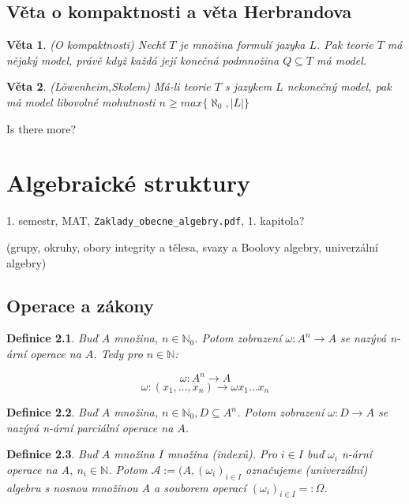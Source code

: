 \documentclass[a4paper, 11pt]{report}
\newtheorem{mydef}{Definice}[chapter]
\newtheorem{veta}{Věta}[chapter]
\begin{document}
\section{Věta o kompaktnosti a věta Herbrandova}

\begin{veta}
(O kompaktnosti) Nechť $T$ je množina formulí jazyka $L$. Pak teorie $T$ má nějaký model, právě když každá její konečná podmnožina $Q \subseteq T$ má model.
\end{veta}

\begin{veta}
(Löwenheim,Skolem) Má-li teorie $T$ s jazykem $L$ nekonečný model, pak má model libovolné mohutnosti $n \geq max\{\aleph_0, |L|\}$
\end{veta}

Is there more?





\chapter{Algebraické struktury} \label{cha:8}

1. semestr, MAT, \texttt{Zaklady\_obecne\_algebry.pdf}, 1. kapitola?

(grupy, okruhy, obory integrity a tělesa, svazy a Boolovy algebry, univerzální algebry)

\section{Operace a zákony}

\begin{mydef}
Buď $A$ množina, $n \in \mathbb{N}_0$. Potom zobrazení $\omega : A^n \to A$ se nazývá n-ární operace na $A$. Tedy pro $n \in \mathbb{N}$:

$$ \omega : A^n \to A $$
$$ \omega : (x_1, \dots, x_n) \to \omega x_1 \dots x_n$$
\end{mydef}

\begin{mydef}
Buď $A$ množina, $n \in \mathbb{N}_0, D \subseteq A^n$. Potom zobrazení $\omega : D \to A$ se nazývá n-ární parciální operace na $A$.
\end{mydef}

\begin{mydef}
Buď $A$ množina $I$ množina (indexů). Pro $i \in I$ buď $\omega_i$ n-ární operace na $A$, $n_i \in \mathbb{N}$. Potom $\mathcal{A} := (A, (\omega_i)_{i \in I}$ označujeme (univerzální) algebru s nosnou množinou $A$ a souborem operací $(\omega_i)_{i \in I} =: \Omega$.
\end{mydef}
\end{document}
